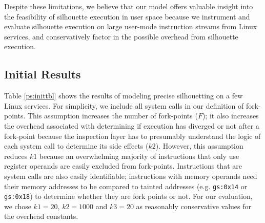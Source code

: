 Despite these limitations, we believe
that our model offers valuable insight
into the feasibility of silhouette execution
in user space because we instrument and evaluate
silhouette execution on large user-mode
instruction streams from Linux services,
and conservatively factor in the possible overhead
from silhouette execution.


\subsection{Initial Results}
 \newline
Table \ref{ps:inittbl} shows the results of modeling 
precise silhouetting on a few Linux services.
For simplicity, we include
all system calls in our definition
of fork-points.
This assumption increases the number of fork-points ($F$);
it also increases the overhead associated with determining 
if execution has diverged or not after a fork-point
because the inspection layer has to presumably
understand the logic of each system call
to determine its side effects ($k2$). However,
this assumption reduces $k1$ because an overwhelming majority
of instructions that only use register operands are easily
excluded from fork-points. Instructions
that are system calls are also easily identifiable;
instructions with memory operands need
their memory addresses to be 
compared to tainted addresses (e.g. \texttt{gs:0x14} or \texttt{gs:0x18})
to determine whether they are fork points or not.
For our evaluation, we chose $k1 = 20$,
$k2 = 1000$ and $k3 = 20$ as reasonably
conservative values for the overhead constants.

